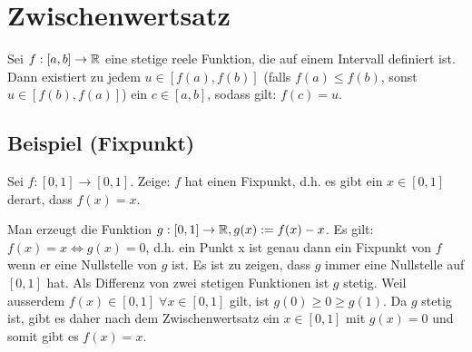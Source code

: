 \section{Zwischenwertsatz}
Sei $f: [a,b] \to \mathbb{R}$ eine stetige reele Funktion, die auf einem Intervall
definiert ist. Dann existiert zu jedem $u \in [f(a), f(b)]$ (falls $f(a) \leq
f(b)$, sonst $u \in [f(b), f(a)]$) ein $c \in [a,b]$, sodass gilt: $f(c)= u$.

\subsection{Beispiel (Fixpunkt)}
Sei $f: [0,1] \to [0,1]$. Zeige: $f$ hat einen Fixpunkt, d.h. es gibt ein $x
\in [0,1]$ derart, dass $f(x) = x$.

Man erzeugt die Funktion $g: [0,1] \to \mathbb{R}, g(x) := f(x) - x$. Es gilt: $f(x) =
x \Leftrightarrow g(x) = 0$, d.h. ein Punkt x ist genau dann ein Fixpunkt von
$f$ wenn er eine Nullstelle von $g$ ist. Es ist zu zeigen, dass $g$ immer eine
Nullstelle auf $[0,1]$ hat. Als Differenz von zwei stetigen Funktionen ist $g$
stetig. Weil ausserdem $f(x) \in [0,1] \; \forall x \in [0,1]$ gilt, ist $g(0)
\geq 0 \geq g(1)$. Da $g$ stetig ist, gibt es daher nach dem Zwischenwertsatz
ein $x \in [0,1]$ mit $g(x) = 0$ und somit gibt es $f(x) = x$.
